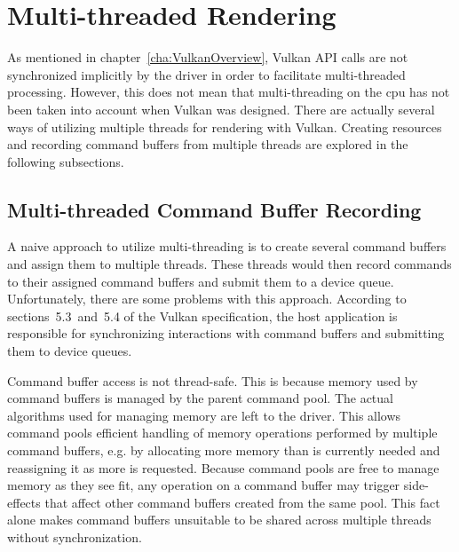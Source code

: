   \section{Multi-threaded Rendering}
  \label{sec:MultithreadedRendering}
    As mentioned in chapter~\ref{cha:VulkanOverview}, Vulkan API calls are not synchronized implicitly by the \gls{driver} in order to facilitate multi-threaded processing.
    However, this does not mean that multi-threading on the \gls{cpu} has not been taken into account when Vulkan was designed.
    There are actually several ways of utilizing multiple threads for rendering with Vulkan.
    Creating resources and recording command buffers from multiple threads are explored in the following subsections.

    \subsection{Multi-threaded Command Buffer Recording}
      A naive approach to utilize multi-threading is to create several command buffers and assign them to multiple threads.
      These threads would then record commands to their assigned command buffers and submit them to a device queue.
      Unfortunately, there are some problems with this approach.
      According to sections~5.3~and~5.4 of the Vulkan specification\cite{vkspec}, the host application is responsible for synchronizing interactions with command buffers and submitting them to device queues.

      Command buffer access is not thread-safe.
      This is because memory used by command buffers is managed by the parent command pool.
      The actual algorithms used for managing memory are left to the \gls{driver}.
      This allows command pools efficient handling of memory operations performed by multiple command buffers, e.g. by allocating more memory than is currently needed and reassigning it as more is requested.
      Because command pools are free to manage memory as they see fit, any operation on a command buffer may trigger side-effects that affect other command buffers created from the same pool.
      This fact alone makes command buffers unsuitable to be shared across multiple threads without synchronization.

